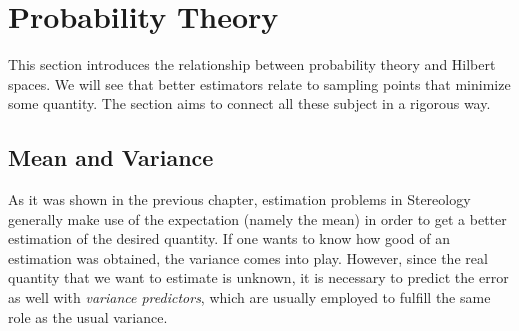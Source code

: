 %
%

\section{Probability Theory}
This section introduces the relationship between probability theory
and Hilbert spaces. We will see that better estimators relate to sampling points that minimize some quantity. The section aims to connect all these subject in a rigorous way.
\subsection{Mean and Variance}
As it was shown in the previous chapter, estimation problems in Stereology generally make use of the expectation (namely the mean) in order to get a better estimation of the desired quantity. If one wants to know how good of an estimation was obtained, the variance comes into play. However, since the real quantity that we want to estimate is unknown, 
it is necessary to predict the error as well with \textit{variance predictors}, which are usually employed to fulfill the same role as the usual variance.\\

